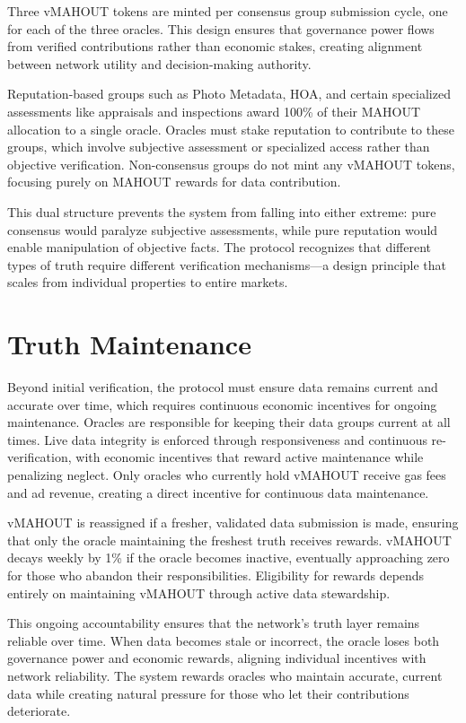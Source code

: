 Three vMAHOUT tokens are minted per consensus group submission cycle, one for each of the three oracles. This design ensures that governance power flows from verified contributions rather than economic stakes, creating alignment between network utility and decision-making authority.

Reputation-based groups such as Photo Metadata, HOA, and certain specialized assessments like appraisals and inspections award 100\% of their MAHOUT allocation to a single oracle. Oracles must stake reputation to contribute to these groups, which involve subjective assessment or specialized access rather than objective verification. Non-consensus groups do not mint any vMAHOUT tokens, focusing purely on MAHOUT rewards for data contribution.

This dual structure prevents the system from falling into either extreme: pure consensus would paralyze subjective assessments, while pure reputation would enable manipulation of objective facts. The protocol recognizes that different types of truth require different verification mechanisms---a design principle that scales from individual properties to entire markets.

\section{Truth Maintenance}

Beyond initial verification, the protocol must ensure data remains current and accurate over time, which requires continuous economic incentives for ongoing maintenance. Oracles are responsible for keeping their data groups current at all times. Live data integrity is enforced through responsiveness and continuous re-verification, with economic incentives that reward active maintenance while penalizing neglect. Only oracles who currently hold vMAHOUT receive gas fees and ad revenue, creating a direct incentive for continuous data maintenance.

vMAHOUT is reassigned if a fresher, validated data submission is made, ensuring that only the oracle maintaining the freshest truth receives rewards. vMAHOUT decays weekly by 1\% if the oracle becomes inactive, eventually approaching zero for those who abandon their responsibilities. Eligibility for rewards depends entirely on maintaining vMAHOUT through active data stewardship.

This ongoing accountability ensures that the network's truth layer remains reliable over time. When data becomes stale or incorrect, the oracle loses both governance power and economic rewards, aligning individual incentives with network reliability. The system rewards oracles who maintain accurate, current data while creating natural pressure for those who let their contributions deteriorate.

